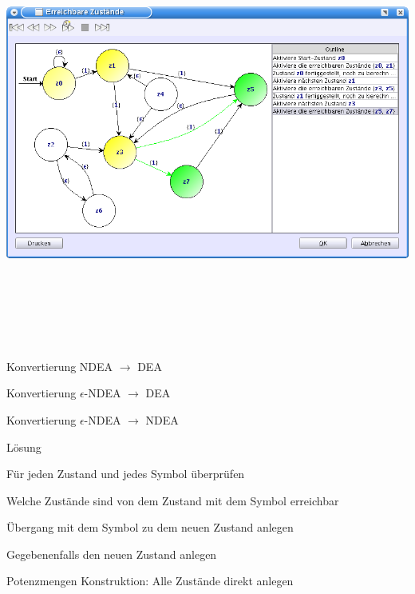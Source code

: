 {
  \begin{center}
    \includegraphics[height=14cm]{../images/reachable_states.png}
  \end{center}
}


{
    \begin{itemgroup}{}
	\item Konvertierung NDEA $\to$ DEA
    \item Konvertierung $\epsilon$-NDEA $\to$ DEA
    \item Konvertierung $\epsilon$-NDEA $\to$ NDEA
    \end{itemgroup}

    \begin{itemgroup}{Lösung}
	\item Für jeden Zustand und jedes Symbol überprüfen
	\begin{itemgroup}{}
	  \item Welche Zustände sind von dem Zustand mit dem Symbol erreichbar
	  \item Übergang mit dem Symbol zu dem neuen Zustand anlegen
	  \item Gegebenenfalls den neuen Zustand anlegen
	\end{itemgroup}
	\item Potenzmengen Konstruktion: Alle Zustände direkt anlegen
	\end{itemgroup}
    
    \vfill{}
}


